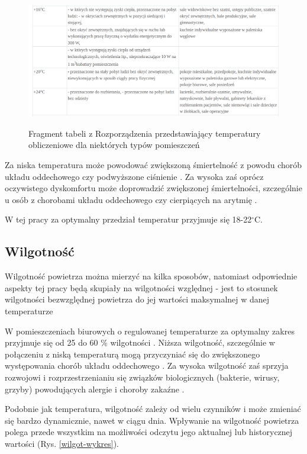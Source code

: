 \begin{figure}[H]
    \caption{Fragment tabeli z Rozporządzenia przedstawiający temperatury obliczeniowe dla niektórych typów pomieszczeń}
    \includegraphics[width=\textwidth]{zdj/min-tabela.png}
    \label{rozporzadzenie-tabela}
\end{figure}

Za niska temperatura może powodować zwiększoną śmiertelność z powodu chorób układu oddechowego czy podwyższone 
ciśnienie \cite{who-cold}. Za wysoka zaś oprócz oczywistego dyskomfortu może doprowadzić zwiększonej śmiertelności, 
szczególnie u osób z chorobami układu oddechowego czy cierpiących na arytmię \cite{bmj-heat}.

W tej pracy za optymalny przedział temperatur przyjmuje się 18-22$^{\circ}$C.

\subsection{Wilgotność}

Wilgotność powietrza można mierzyć na kilka sposobów, natomiast odpowiednie aspekty tej pracy będą 
skupiały na wilgotności względnej - jest to stosunek wilgotności bezwzględnej powietrza do jej wartości 
maksymalnej w danej temperaturze \cite{termodynamika}

W pomieszczeniach biurowych o regulowanej temperaturze za optymalny zakres przyjmuje się 
od 25 do 60 \% wilgotności \cite{inz-bud}. Niższa wilgotność, szczególnie w połączeniu z niską temperaturą 
mogą przyczyniać się do zwiększonego występowania chorób układu oddechowego \cite{low-hum}. Za wysoka wilgotność 
zaś sprzyja rozwojowi i rozprzestrzenianiu się związków biologicznych (bakterie, wirusy, grzyby) 
powodujących alergie i choroby zakaźne \cite{high-hum}.

Podobnie jak temperatura, wilgotność zależy od wielu czynników i może zmieniać się bardzo dynamicznie, 
nawet w ciągu dnia. Wpływanie na wilgotność powietrza polega przede wszystkim na możliwości odczytu 
jego aktualnej lub historycznej wartości (Rys. \ref{wilgot-wykres}).

